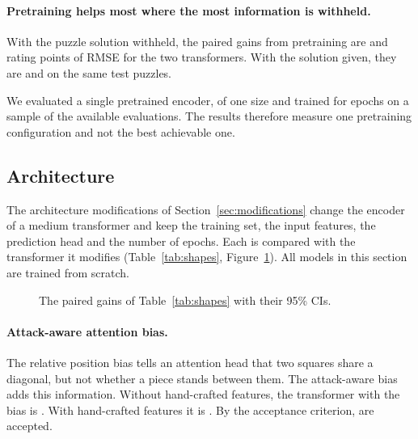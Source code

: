 \documentclass[11pt]{article}
\begin{document}
\paragraph{Pretraining helps most where the most information is withheld.}
With the puzzle solution withheld, the paired gains from pretraining are
and
rating points of RMSE for the two transformers. With the solution given,
they are
and
on the same test puzzles.

We evaluated a single pretrained encoder, of one size and trained for
 epochs on a sample of the available
evaluations. The results therefore measure one pretraining configuration and
not the best achievable one.

\subsection{Architecture}
\label{sec:shapes}

The architecture modifications of Section~\ref{sec:modifications} change the
encoder of a medium transformer and keep the training set, the input
features, the prediction head and the number of epochs. Each is compared
with the transformer it modifies (Table~\ref{tab:shapes},
Figure~\ref{fig:shapes}). All models in this section are trained from
scratch.

\begin{table}[htbp]\centering\small
{}
\caption{Architecture modifications: paired gain of the modified model over
the transformer named in the column head, by task, in points of normalised
score with the 95\% CI. Gains in bold are statistically significant.}
\label{tab:shapes}
\end{table}

\begin{figure}[htbp]\centering
{}
\caption{The paired gains of Table~\ref{tab:shapes} with their 95\% CIs.}
\label{fig:shapes}
\end{figure}

\paragraph{Attack-aware attention bias.}
The relative position bias tells an attention head that two squares share a
diagonal, but not whether a piece stands between them. The attack-aware bias
adds this information. Without hand-crafted features, the transformer with
the bias is . With
hand-crafted features it is
. By the acceptance
criterion,  are accepted.
\end{document}

